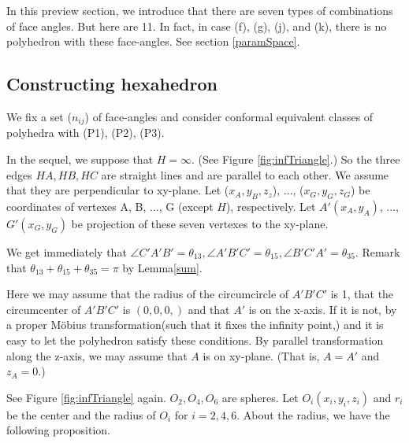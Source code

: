 \documentclass[suppldata, dvipdfmx]{interact}
\theoremstyle{plain}%
\theoremstyle{definition}
\theoremstyle{remark}
\theoremstyle{problemstyle}
\begin{document}
In this preview section, we introduce that there are seven types of
combinations of face angles. But here are 11. In fact, in case (f), (g),
(j), and (k), there is no polyhedron with these face-angles. See section \ref{paramSpace}.

\subsection{Constructing hexahedron}

We fix a set ($n_{ij}$) of face-angles and consider conformal equivalent
classes of polyhedra with (P1), (P2), (P3).

In the sequel, we suppose that $H = \infty$. (See Figure
\ref{fig:infTriangle}.) So the three
edges $HA, HB, HC$ are straight lines and are parallel to each other. We
assume that they are perpendicular to xy-plane.
Let ($x_A, y_B, z_z$), ..., ($x_G, y_G, z_G$) be coordinates of vertexes
A, B, ..., G (except $H$), respectively. Let $A'(x_A, y_A)$, ...,
$G'(x_G, y_G)$ be projection of these seven vertexes to the xy-plane.

We get immediately that $\angle C'A'B' = \theta_{13}, \angle A'B'C' =
\theta_{15}, \angle B'C'A'=\theta_{35}$. Remark that $\theta_{13} +
\theta_{15} + \theta_{35} = \pi$ by Lemma\ref{sum}.

Here we may assume that the radius of the circumcircle of $A'B'C'$ is 1,
that the circumcenter of $A'B'C'$ is $(0, 0, 0,)$ and that $A'$ is on
the x-axis. If it is not, by a proper M\"obius transformation(such that
it fixes the infinity point,) and it is easy to let the polyhedron
satisfy these conditions. By parallel transformation along the z-axis, we
may assume that $A$ is on xy-plane. (That is, $A = A'$ and $z_A = 0.$)

See Figure \ref{fig:infTriangle} again. $O_2, O_4, O_6$ are spheres. Let $O_i(x_i, y_i, z_i)$
and $r_i$ be the center and the radius of $O_i$ for $i = 2, 4, 6.$ About
the radius, we have the following proposition.
\end{document}
